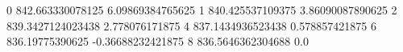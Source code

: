 0 842.663330078125 6.09869384765625
1 840.425537109375 3.86090087890625
2 839.3427124023438 2.778076171875
4 837.1434936523438 0.578857421875
6 836.19775390625 -0.36688232421875
8 836.5646362304688 0.0
